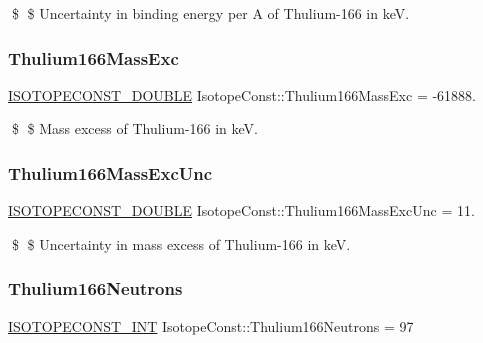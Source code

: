 \$ \$ Uncertainty in binding energy per A of Thulium-\/166 in keV. \mbox{\label{group___isotope_const-_thulium-_tm166_gaa8de8b67ad3c682b08cbede22ac79e60}} 
\subsubsection{\texorpdfstring{Thulium166\+Mass\+Exc}{Thulium166MassExc}}
{\footnotesize\ttfamily \mbox{\hyperlink{group___isotope_const-_macros_ga8f45a7272ce02c0b4c65c44636ed719a}{I\+S\+O\+T\+O\+P\+E\+C\+O\+N\+S\+T\+\_\+\+D\+O\+U\+B\+LE}} Isotope\+Const\+::\+Thulium166\+Mass\+Exc = -\/61888.}

\$ \$ Mass excess of Thulium-\/166 in keV. \mbox{\label{group___isotope_const-_thulium-_tm166_gad13c66a11cfeab5ed47d7b983533f22e}} 
\subsubsection{\texorpdfstring{Thulium166\+Mass\+Exc\+Unc}{Thulium166MassExcUnc}}
{\footnotesize\ttfamily \mbox{\hyperlink{group___isotope_const-_macros_ga8f45a7272ce02c0b4c65c44636ed719a}{I\+S\+O\+T\+O\+P\+E\+C\+O\+N\+S\+T\+\_\+\+D\+O\+U\+B\+LE}} Isotope\+Const\+::\+Thulium166\+Mass\+Exc\+Unc = 11.}

\$ \$ Uncertainty in mass excess of Thulium-\/166 in keV. \mbox{\label{group___isotope_const-_thulium-_tm166_gae7c55906810945eed801516b4ce2332e}} 
\subsubsection{\texorpdfstring{Thulium166\+Neutrons}{Thulium166Neutrons}}
{\footnotesize\ttfamily \mbox{\hyperlink{group___isotope_const-_macros_ga5f18360b3e99483a35c32d789e62621c}{I\+S\+O\+T\+O\+P\+E\+C\+O\+N\+S\+T\+\_\+\+I\+NT}} Isotope\+Const\+::\+Thulium166\+Neutrons = 97}


